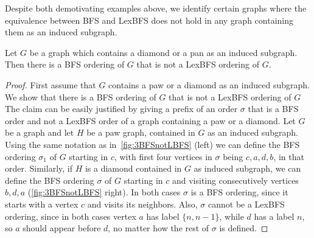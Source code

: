 \documentclass{svproc}
\begin{document}
Despite both demotivating examples above, we identify certain graphs where the equivalence between BFS and LexBFS does not hold in any graph containing them as an induced subgraph.

\begin{lemma}\label{lemma:paw-diamond-bfs}
Let $G$ be a graph which contains a diamond or a pan as an induced subgraph. Then there is a BFS ordering of $G$ that is not a LexBFS ordering of $G$.
\end{lemma}
\begin{proof}
First assume that $G$ contains a paw or a diamond as an induced subgraph. We show that there is a BFS ordering of $G$ that is not a LexBFS ordering of $G$ 
The claim can be easily justified by giving a prefix of an order $\sigma$ that is a BFS order and not a LexBFS order of a graph containing a paw or a diamond.
Let $G$ be a graph and let $H$ be a paw graph, contained in $G$ as an induced subgraph. Using the same notation as in~\cref{fig:3BFSnotLBFS} (left) we can define the BFS ordering $\sigma_1$ of $G$ starting in $c$, with first four vertices in $\sigma$ being $c,a,d,b$, in that order. Similarly, if $H$ is a diamond contained in $G$ as induced subgraph, we can define the BFS ordering $\sigma$ of $G$ starting in $c$ and visiting consecutively vertices $b,d,a$ (\cref{fig:3BFSnotLBFS} right). In both cases $\sigma $ is a BFS ordering, since it starts with a vertex $c$ and visits its neighbors. 
Also, $\sigma$ cannot be a LexBFS ordering, since in both cases vertex $a$ has label $\{n, n-1\}$, while $d$ has a label $n$, so $a$ should appear before $d$, no matter how the rest of $\sigma$ is defined. 


\end{proof}
\end{document}
